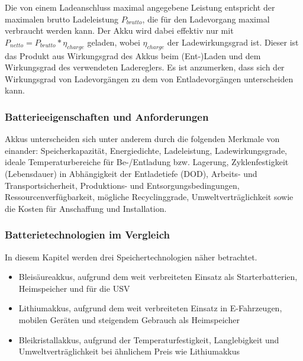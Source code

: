 		Die von einem Ladeanschluss maximal angegebene Leistung entspricht der maximalen brutto Ladeleistung $P_{brutto}$, die für den Ladevorgang maximal verbraucht werden kann. Der Akku wird dabei effektiv nur mit $P_{netto} = P_{brutto} * \eta_{charge}$ geladen, wobei $\eta_{charge}$ der Ladewirkungsgrad ist. Dieser ist das Produkt aus Wirkungsgrad des Akkus beim (Ent-)Laden und dem Wirkungsgrad des verwendeten Ladereglers. Es ist anzumerken, dass sich der Wirkungsgrad von Ladevorgängen zu dem von Entladevorgängen unterscheiden kann.\\
		
		 
		

			
					
	\subsubsection{Batterieeigenschaften und Anforderungen}
		Akkus unterscheiden sich unter anderem durch die folgenden Merkmale von einander: Speicherkapazität, Energiedichte, Ladeleistung, Ladewirkungsgrade, ideale Temperaturbereiche für Be-/Entladung bzw. Lagerung, Zyklenfestigkeit (Lebensdauer) in Abhängigkeit der Entladetiefe (\ac{DOD}), Arbeits- und Transportsicherheit, Produktions- und Entsorgungsbedingungen, Ressourcenverfügbarkeit, mögliche Recyclinggrade, Umweltverträglichkeit sowie die Kosten für Anschaffung und Installation. \\
		
		

			
		
		\subsubsection{Batterietechnologien im Vergleich}
			In diesem Kapitel werden drei Speichertechnologien näher betrachtet.
			\begin{itemize}
				\item Bleisäureakkus, aufgrund dem weit verbreiteten Einsatz als Starterbatterien, Heimspeicher und für die \ac{USV}
				\item Lithiumakkus, aufgrund dem weit verbreiteten Einsatz in E-Fahrzeugen, mobilen Geräten und steigendem Gebrauch als Heimspeicher
				\item Bleikristallakkus, aufgrund der Temperaturfestigkeit, Langlebigkeit und Umweltverträglichkeit bei ähnlichem Preis wie Lithiumakkus
			\end{itemize}
			
